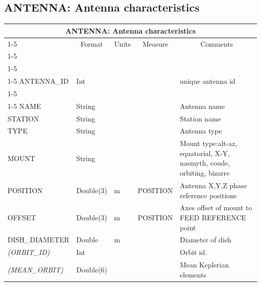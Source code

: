\documentclass{article}
\newcommand{\defline}[1]{\cline{1-5}
\multicolumn{5}{|l|}{#1} \\
\cline{1-5}}
\newcommand{\definetable}[2]
{
	\vfill\newpage
	\subsection{#1}
        \vspace{0.15in}
        \small
	\begin{tabular}{|l|p{1.25in}|l|p{.9in}|p{1.4in}|}
	\hline
	\multicolumn{5}{|c|}{\bf #1}\\ 
	\cline{1-5}
        \multicolumn{1}{|c|}{Name}&\multicolumn{1}{|c|}{Format}&
        \multicolumn{1}{|c|}{Units}&\multicolumn{1}{|c|}{Measure}&
        \multicolumn{1}{|c|}{Comments}\\
        \cline{1-5}
        #2
        \hline
	\end{tabular}
}
\begin{document}
\definetable{ANTENNA: Antenna characteristics}
{
\defline{\bf Columns}
\defline{\bf Keys}
ANTENNA\_ID &  Int &  &  &  unique antenna id \\
\defline{\em Data}
NAME &       String &  & &  Antenna name \\
STATION &        String & & &  Station name \\
TYPE  &  String &     &      & Antenna type \\
MOUNT  & String &  & &   Mount type:alt-az, equatorial, X-Y, nasmyth, coude, orbiting, bizarre \\
POSITION &   Double(3) &  m   &     POSITION &   Antenna X,Y,Z phase reference positions \\
OFFSET & Double(3)  &   m &     POSITION & Axes offset of mount to FEED REFERENCE point \\
DISH\_DIAMETER &  Double &  m  &      & Diameter of dish\\
{\it (ORBIT\_ID)}    &    Int & & &  Orbit id. \\
{\it (MEAN\_ORBIT)}  &    Double(6) & & & Mean Keplerian elements\\
}
\end{document}
